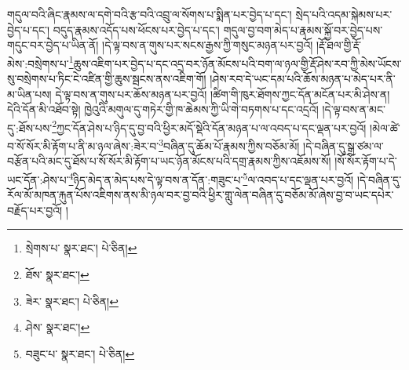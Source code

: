 གདུལ་བའི་ཞིང་རྣམས་ལ་དགེ་བའི་རྩ་བའི་འབྲུ་ལ་སོགས་པ་སྨིན་པར་བྱེད་པ་དང་། སྲེད་པའི་འདམ་སྐེམས་པར་བྱེད་པ་དང་། བདུད་རྣམས་འདོད་པས་ཕོངས་པར་བྱེད་པ་དང་། གདུལ་བྱ་བག་མེད་པ་རྣམས་སྐྱོ་བར་བྱེད་པས་གདུང་བར་བྱེད་པ་ཡིན་ནོ། །དེ་ལྟ་བས་ན་གུས་པར་སངས་རྒྱས་ཀྱི་གསུང་མཉན་པར་བྱའོ། །རྡོ་ཐལ་གྱི་རྡོ་མེས་:བསྲེགས་པ་\footnote{སྲེགས་པ་  སྣར་ཐང་།  པེ་ཅིན། }ཆུས་འཇིག་པར་བྱེད་པ་དང་འདྲ་བར་ཉོན་མོངས་པའི་བག་ལ་ཉལ་གྱི་རྡོ་ཤེས་རབ་ཀྱི་མེས་ཡོངས་སུ་བསྲེགས་པ་ཏིང་ངེ་འཛིན་གྱི་ཆུས་སྦངས་ནས་འཇིག་གོ། །ཤེས་རབ་དེ་ཡང་དམ་པའི་ཆོས་མཉན་པ་མེད་པར་ནི་མ་ཡིན་པས། དེ་ལྟ་བས་ན་གུས་པར་ཆོས་མཉན་པར་བྱའོ། །ཚིག་གི་ཁུར་ཐོགས་ཀྱང་དོན་མངོན་པར་མི་ཤེས་ན། དེའི་དོན་མི་འཐོབ་སྟེ། ཁྱེའུའི་མགུལ་དུ་གཏེར་གྱི་ཁ་ཆེམས་ཀྱི་ཡི་གེ་བཏགས་པ་དང་འདྲའོ། །དེ་ལྟ་བས་ན་མང་དུ་:ཐོས་པས་\footnote{ཐོས་  སྣར་ཐང་། }ཀྱང་དོན་ཤེས་པ་ཉིད་དུ་བྱ་བའི་ཕྱིར་མདོ་སྡེའི་དོན་མཉན་པ་ལ་འབད་པ་དང་ལྡན་པར་བྱའོ། །མེལ་ཚེ་བ་སོ་སོར་མི་རྟོག་པ་ནི་མ་ཉལ་ཞེས་:ཟེར་བ་\footnote{ཟེར་  སྣར་ཐང་།  པེ་ཅིན། }བཞིན་དུ་ཆོམ་པོ་རྣམས་ཀྱིས་བཅོམ་མོ། །དེ་བཞིན་དུ་སྒྲ་ཙམ་ལ་བརྩོན་པའི་མང་དུ་ཐོས་པ་སོ་སོར་མི་རྟོག་པ་ཡང་ཉོན་མོངས་པའི་དགྲ་རྣམས་ཀྱིས་འཇོམས་སོ། །སོ་སོར་རྟོག་པ་དེ་ཡང་དོན་:ཤེས་པ་\footnote{ཤེས་  སྣར་ཐང་། }ཉིད་མེད་ན་མེད་པས་དེ་ལྟ་བས་ན་དོན་:གཟུང་པ་\footnote{བཟུང་པ་  སྣར་ཐང་།  པེ་ཅིན། }ལ་འབད་པ་དང་ལྡན་པར་བྱའོ། །དེ་བཞིན་དུ་རོལ་མོ་མཁན་རྐུན་པོས་འཇིགས་ནས་མི་ཉལ་བར་བྱ་བའི་ཕྱིར་གླུ་ལེན་བཞིན་དུ་བཅོམ་མོ་ཞེས་བྱ་བ་ཡང་དཔེར་བརྗོད་པར་བྱའོ། །
